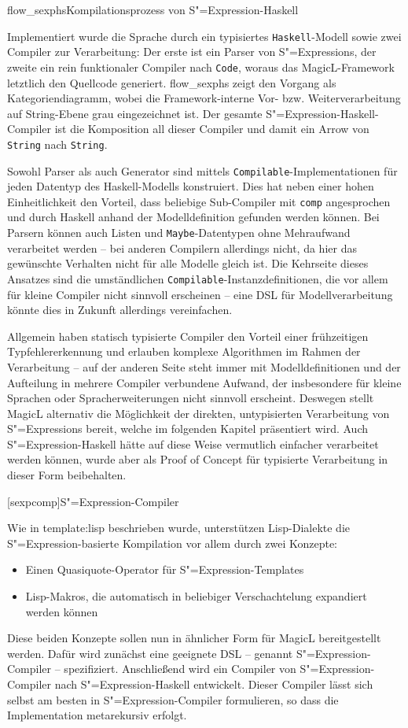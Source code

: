 \documentclass[11pt, a4paper, bibgerm]{scrbook}
\newcommand\icode[1]{\lstinline?#1?}
\newcommand\lchapter{}
\newcommand\sref{}
\newcommand\abb{}
\newcommand\fig{}
\newcommand{\sexp}{S"=Expression}
\newcommand{\sexps}{S"=Expressions}
\begin{document}
\fig{flow_sexphs}{Kompilationsprozess von \sexp{}-Haskell}

Implementiert wurde die Sprache durch ein typisiertes
\icode{Haskell}-Modell sowie zwei Compiler zur Verarbeitung: Der erste
ist ein Parser von \sexps{}, der zweite ein rein funktionaler Compiler
nach \icode{Code}, woraus das MagicL-Framework letztlich den Quellcode
generiert. \abb{flow_sexphs} zeigt den Vorgang als Kategoriendiagramm,
wobei die Framework-interne Vor- bzw. Weiterverarbeitung auf
String-Ebene grau eingezeichnet ist. Der gesamte
\sexp{}-Haskell-Compiler ist die Komposition all dieser Compiler und
damit ein Arrow von \icode{String} nach \icode{String}.

Sowohl Parser als auch Generator sind mittels
\icode{Compilable}-Implementationen für jeden Datentyp des
Haskell-Modells konstruiert. Dies hat neben einer hohen Einheitlichkeit
den Vorteil, dass beliebige Sub-Compiler mit \icode{comp} angesprochen
und durch Haskell anhand der Modelldefinition gefunden werden
können. Bei Parsern können auch Listen und \icode{Maybe}-Datentypen ohne
Mehraufwand verarbeitet werden -- bei anderen Compilern allerdings nicht,
da hier das gewünschte Verhalten nicht für alle Modelle gleich ist. Die
Kehrseite dieses Ansatzes sind die umständlichen
\icode{Compilable}-Instanzdefinitionen, die vor allem für kleine
Compiler nicht sinnvoll erscheinen -- eine DSL für Modellverarbeitung
könnte dies in Zukunft allerdings vereinfachen.

Allgemein haben statisch typisierte Compiler den Vorteil einer
frühzeitigen Typfehlererkennung und erlauben komplexe Algorithmen im
Rahmen der Verarbeitung -- auf der anderen Seite steht immer mit
Modelldefinitionen und der Aufteilung in mehrere Compiler verbundene
Aufwand, der insbesondere für kleine Sprachen oder Spracherweiterungen
nicht sinnvoll erscheint. Deswegen stellt MagicL alternativ die
Möglichkeit der direkten, untypisierten Verarbeitung von \sexps{}
bereit, welche im folgenden Kapitel präsentiert wird. Auch
\sexp{}-Haskell hätte auf diese Weise vermutlich einfacher verarbeitet
werden können, wurde aber als Proof of Concept für typisierte
Verarbeitung in dieser Form beibehalten.

\lchapter[sexpcomp]{\sexp{}-Compiler}

Wie in \sref{template:lisp} beschrieben wurde, unterstützen
Lisp-Dialekte die \sexp{}-basierte Kompilation vor allem durch zwei
Konzepte: 
\begin{itemize}
\item Einen Quasiquote-Operator für \sexp{}-Templates
\item Lisp-Makros, die automatisch in beliebiger Verschachtelung
  expandiert werden können
\end{itemize}
Diese beiden Konzepte sollen nun in ähnlicher Form für MagicL
bereitgestellt werden. Dafür wird zunächst eine geeignete DSL -- genannt
\sexp{}-Compiler -- spezifiziert. Anschließend wird ein Compiler von
\sexp{}-Compiler nach \sexp{}-Haskell entwickelt. Dieser Compiler lässt
sich selbst am besten in \sexp{}-Compiler formulieren, so dass die
Implementation metarekursiv erfolgt.
\end{document}
